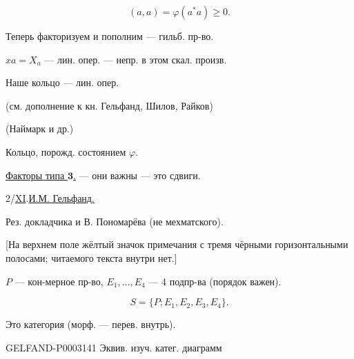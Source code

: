 \begin{equation*}(a,a)=\varphi(a^*a)\ge0.\end{equation*}

Теперь факторизуем и пополним --- гильб. пр-во.

$x a=X_a$ --- лин. опер. --- непр. в этом скал. произв.





Наше кольцо --- лин. опер.

(см. дополнение к кн. Гельфанд, Шилов, Райков)

(Наймарк и др.)

Кольцо, порожд. состоянием $\varphi$.

\uline{Факторы типа $\mathbf3$.} --- они важны --- это сдвиги.



2/\underline{XI}.\qquad\underline{И.М. Гельфанд.}

Рез. докладчика и В. Пономарёва (не мехматского).

[На верхнем поле жёлтый значок примечания с тремя чёрными горизонтальными полосами; читаемого текста внутри нет.]

$P$ --- кон-мерное пр-во, $E_1,\ldots,E_4$ --- 4 подпр-ва (порядок важен).

\begin{equation*}S=\{P;E_1,E_2,E_3,E_4\}.\end{equation*}

Это категория (морф. --- перев. внутрь).

\begin{GelfandAdjacentEvidence}{GELFAND-P000314}{1}
Эквив. изуч. катег. диаграмм





\end{GelfandAdjacentEvidence}


